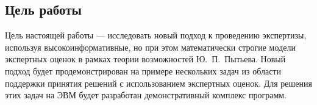 \subsection{Цель работы}
Цель настоящей работы --- исследовать новый подход к проведению экспертизы, используя высокоинформативные, но при этом математически строгие модели экспертных оценок в рамках теории возможностей Ю.~П.~Пытьева. Новый подход будет продемонстрирован на примере нескольких задач из области поддержки принятия решений с использованием экспертных оценок. Для решения этих задач на ЭВМ будет разработан демонстративный комплекс программ.

